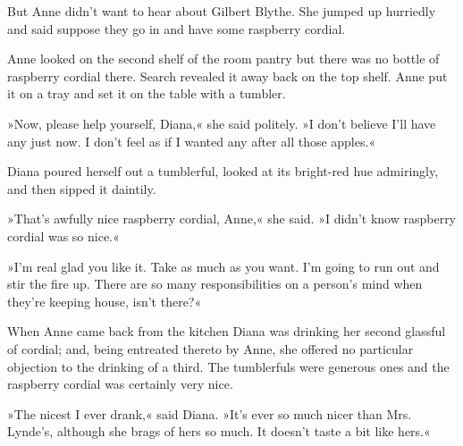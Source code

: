 But Anne didn’t want to hear about Gilbert Blythe. She jumped up hurriedly and said suppose they go in and have some raspberry cordial.

Anne looked on the second shelf of the room pantry but there was no bottle of raspberry cordial there. Search revealed it away back on the top shelf. Anne put it on a tray and set it on the table with a tumbler.

»Now, please help yourself, Diana,« she said politely. »I don’t believe I’ll have any just now. I don’t feel as if I wanted any after all those apples.«

Diana poured herself out a tumblerful, looked at its bright-red hue admiringly, and then sipped it daintily.

»That’s awfully nice raspberry cordial, Anne,« she said. »I didn’t know raspberry cordial was so nice.«

»I’m real glad you like it. Take as much as you want. I’m going to run out and stir the fire up. There are so many responsibilities on a person’s mind when they’re keeping house, isn’t there?«

When Anne came back from the kitchen Diana was drinking her second glassful of cordial; and, being entreated thereto by Anne, she offered no particular objection to the drinking of a third. The tumblerfuls were generous ones and the raspberry cordial was certainly very nice.

»The nicest I ever drank,« said Diana. »It’s ever so much nicer than Mrs. Lynde’s, although she brags of hers so much. It doesn’t taste a bit like hers.«

